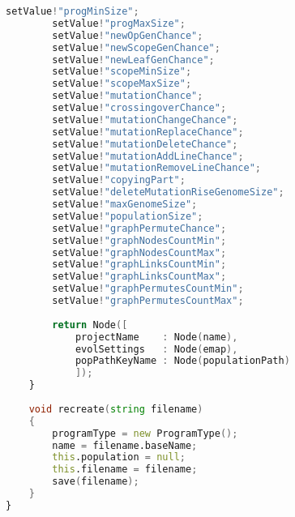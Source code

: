 \documentclass[russian,utf8,emptystyle]{eskdtext}
\begin{document}
\begin{lstlisting}[language=D]
        setValue!"progMinSize";
        setValue!"progMaxSize";
        setValue!"newOpGenChance";
        setValue!"newScopeGenChance";
        setValue!"newLeafGenChance";
        setValue!"scopeMinSize";
        setValue!"scopeMaxSize";
        setValue!"mutationChance";
        setValue!"crossingoverChance";
        setValue!"mutationChangeChance";
        setValue!"mutationReplaceChance";
        setValue!"mutationDeleteChance";
        setValue!"mutationAddLineChance";
        setValue!"mutationRemoveLineChance";
        setValue!"copyingPart";
        setValue!"deleteMutationRiseGenomeSize";
        setValue!"maxGenomeSize";
        setValue!"populationSize";
        setValue!"graphPermuteChance";
        setValue!"graphNodesCountMin";
        setValue!"graphNodesCountMax";
        setValue!"graphLinksCountMin";
        setValue!"graphLinksCountMax";
        setValue!"graphPermutesCountMin";
        setValue!"graphPermutesCountMax";
            
        return Node([
            projectName    : Node(name),
            evolSettings   : Node(emap),
            popPathKeyName : Node(populationPath)
            ]);
    }
    
    void recreate(string filename)
    {
        programType = new ProgramType();
        name = filename.baseName;
        this.population = null;
        this.filename = filename;
        save(filename);
    }
}
\end{lstlisting}
\end{document}

